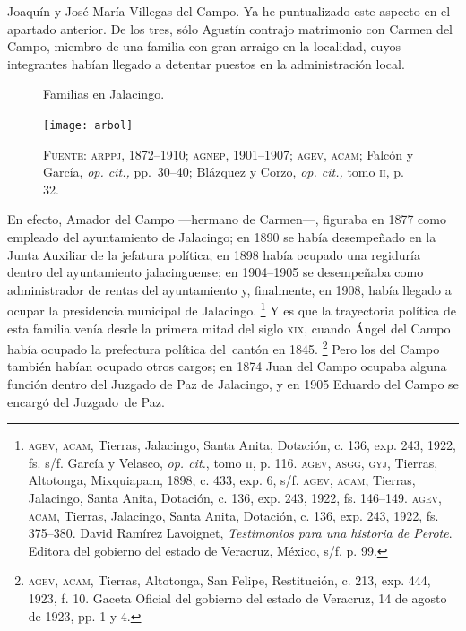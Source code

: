 \documentclass[14pt,twoside,final]{extbook} %
\let\oldfootnote\footnote
\renewcommand\footnote[1]{%
\oldfootnote{\hspace{1mm}#1}}
\begin{document}
Joaquín y José María Villegas del Campo. Ya he puntualizado este aspecto en el apartado anterior. De los tres, sólo Agustín contrajo matrimonio con Carmen del Campo, miembro de una familia con gran arraigo en la localidad, cuyos integrantes habían llegado a detentar puestos en la administración local.
\begin{figure}
\centering
\caption[Familias en Jalacingo]{Familias en Jalacingo.}
\texttt{[image: arbol]}
\caption*{\textsc{Fuente:} \textsc{arppj, 1872--1910}; \textsc{agnep}, 1901--1907; \textsc{agev, acam}; Falcón y García, \emph{op. cit.,} pp.~30--40; Blázquez y Corzo, \emph{op. cit.,} tomo \textsc{ii}, p. 32.}
\label{fig:arbol-genealogico}
\end{figure}
En efecto, Amador del Campo ---hermano de Carmen---, figuraba en 1877 como empleado del ayuntamiento de Jalacingo; en 1890 se había desempeñado en la Junta Auxiliar de la jefatura política; en 1898 había ocupado una regiduría dentro del ayuntamiento jalacinguense; en 1904--1905 se desempeñaba como administrador de rentas del ayuntamiento y, finalmente, en 1908, había llegado a ocupar la presidencia municipal de Jalacingo.\footnote{\textsc{agev, acam}, Tierras, Jalacingo, Santa Anita, Dotación, c. 136, exp. 243, 1922, fs. s/f. García y Velasco, \emph{op. cit.}, tomo \textsc{ii}, p. 116. \textsc{agev, asgg, gyj}, Tierras, Altotonga, Mixquiapam, 1898, c. 433, exp. 6, s/f. \textsc{agev, acam}, Tierras, Jalacingo, Santa Anita, Dotación, c. 136, exp. 243, 1922, fs. 146--149. \textsc{agev, acam}, Tierras, Jalacingo, Santa Anita, Dotación, c. 136, exp. 243, 1922, fs. 375--380. David Ramírez Lavoignet, \emph{Testimonios para una historia de Perote}. Editora del gobierno del estado de Veracruz, México, s/f, p. 99.} Y es que la trayectoria política de esta familia venía desde la primera mitad del siglo \textsc{xix}, cuando Ángel del Campo había ocupado la prefectura política del~cantón en 1845.\footnote{\textsc{agev, acam}, Tierras, Altotonga, San Felipe, Restitución, c. 213, exp. 444, 1923, f. 10. Gaceta Oficial del gobierno del estado de Veracruz, 14 de agosto de 1923, pp. 1 y 4.} Pero los del Campo también habían ocupado otros cargos; en 1874 Juan del Campo ocupaba alguna función dentro del Juzgado de Paz de Jalacingo, y en 1905 Eduardo del Campo se encargó del Juzgado~de Paz.
\end{document}
